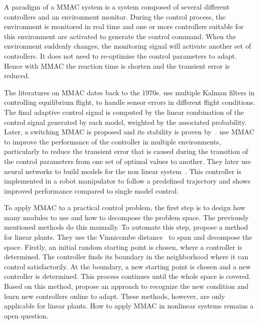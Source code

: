 A paradigm of a MMAC system is a system composed of several different controllers and an environment monitor. During the control process, the environment is monitored in real time and one or more controllers suitable for this environment are activated to generate the control command. When the environment suddenly changes, the monitoring signal will activate another set of controllers. It does not need to re-optimise the control parameters to adapt. Hence with MMAC the reaction time is shorten and the transient error is reduced.

%


The literatures on MMAC dates back to the 1970s. \citet{athans1977stochastic} use multiple Kalman filters in controlling equilibrium flight, to handle sensor errors in different flight conditions. The final adaptive control signal is computed by the linear combination of the control signal generated by each model, weighted by the associated probability. Later, a switching MMAC is proposed and its stability is proven by~\citet{fu1986adaptive}.
\citet{narendra1994improving} use MMAC to improve the performance of the controller in multiple environments, particularly to reduce the transient error that is caused during the transition of the control parameters from one set of optimal values to another. They later use neural networks to build models for the non linear system~\citep{narendra1995adaptation,narendra1997adaptive}. This controller is implemented in a robot manipulator to follow a predefined trajectory and shows improved performance compared to single model control.

To apply MMAC to a practical control problem, the first step is to design how many modules to use and how to decompose the problem space. The previously mentioned methods do this manually. To automate this step, \citet{anderson2000multiple} propose a method for linear plants. They use the Vinnicombe distance~\citep{vinnicombe1993frequency} to span and decompose the space. Firstly, an initial random starting point is chosen, where a controller is determined. The controller finds its boundary in the neighborhood where it can control satisfactorily.
At the boundary, a new starting point is chosen and a new controller is determined. This process continues until the whole space is covered. Based on this method, \citet{lourenco2006learning} propose an approach to recognize the new condition and learn new controllers online to adapt. These methods, however, are only applicable for linear plants. How to apply MMAC in nonlinear systems remains a open question.


